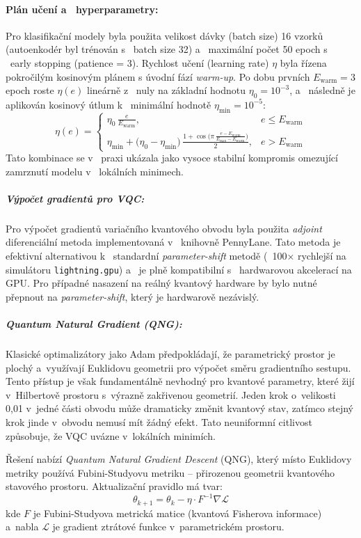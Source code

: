 \documentclass[12pt, a4paper]{report}
\begin{document}
\paragraph{Plán učení a ~hyperparametry:}
Pro klasifikační modely byla použita velikost dávky (batch size) 16 vzorků (autoenkodér byl trénován s ~batch size 32) a ~maximální počet 50 epoch s ~early stopping (patience = 3). Rychlost učení (learning rate) $\eta$ byla řízena pokročilým kosinovým plánem s úvodní fází \textit{warm-up}. Po dobu prvních $E_{\mathrm{warm}} = 3$ epoch roste $\eta(e)$ lineárně z ~nuly na základní hodnotu $\eta_0 = 10^{-3}$, a ~následně je aplikován kosinový útlum k ~minimální hodnotě $\eta_{\min} = 10^{-5}$:
\begin{equation}
  \eta(e) =
  \begin{cases}
    \eta_0 \,\frac{e}{E_{\mathrm{warm}}}, & e \leq E_{\mathrm{warm}} \\[1.0em]
    \eta_{\min} + \bigl(\eta_0 - \eta_{\min}\bigr)\, \frac{1 + \cos\!\bigl(\pi\,\tfrac{e-E_{\mathrm{warm}}}{E_{\mathrm{max}}-E_{\mathrm{warm}}}\bigr)}{2}, & e > E_{\mathrm{warm}}
  \end{cases}
\end{equation}
Tato kombinace se v ~praxi ukázala jako vysoce stabilní kompromis omezující zamrznutí modelu v ~lokálních minimech.

\subparagraph{Výpočet gradientů pro VQC:}
Pro výpočet gradientů variačního kvantového obvodu byla použita \textit{adjoint} diferenciální metoda implementovaná v ~knihovně PennyLane. Tato metoda je efektivní alternativou k ~standardní \textit{parameter-shift} metodě (~100× rychlejší na simulátoru \texttt{lightning.gpu}) a ~je plně kompatibilní s ~hardwarovou akcelerací na GPU. Pro případné nasazení na reálný kvantový hardware by bylo nutné přepnout na \textit{parameter-shift}, který je hardwarově nezávislý.

\subparagraph{Quantum Natural Gradient (QNG):}
Klasické optimalizátory jako Adam předpokládají, že parametrický prostor je plochý a~využívají Euklidovu geometrii pro výpočet směru gradientního sestupu. Tento přístup je však fundamentálně nevhodný pro kvantové parametry, které žijí v~Hilbertově prostoru s~výrazně zakřivenou geometrií. Jeden krok o~velikosti 0{,}01 v~jedné části obvodu může dramaticky změnit kvantový stav, zatímco stejný krok jinde v~obvodu nemusí mít žádný efekt. Tato neuniformní citlivost způsobuje, že VQC uvázne v~lokálních minimích.

Řešení nabízí \textit{Quantum Natural Gradient Descent} (QNG), který místo Euklidovy metriky používá Fubini-Studyovu metriku – přirozenou geometrii kvantového stavového prostoru. Aktualizační pravidlo má tvar:
\begin{equation}
    \theta_{k+1} = \theta_k - \eta \cdot F^{-1} \nabla \mathcal{L}
\end{equation}
kde $F$ je Fubini-Studyova metrická matice (kvantová Fisherova informace) a~nabla $\mathcal{L}$ je gradient ztrátové funkce v~parametrickém prostoru.
\end{document}
